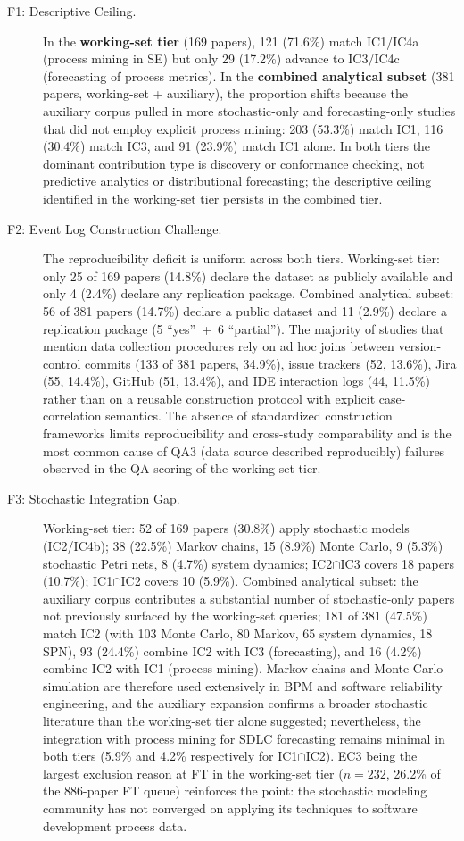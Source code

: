 \begin{description}

\item[F1: Descriptive Ceiling.]
In the \textbf{working-set tier} (169 papers), 121 (71.6\%) match IC1/IC4a
(process mining in SE) but only 29 (17.2\%) advance to IC3/IC4c (forecasting
of process metrics). In the \textbf{combined analytical subset} (381 papers, working-set
+ auxiliary), the proportion shifts because the auxiliary corpus pulled in
more stochastic-only and forecasting-only studies that did not employ
explicit process mining: 203 (53.3\%) match IC1, 116 (30.4\%) match IC3,
and 91 (23.9\%) match IC1 alone. In both tiers the dominant contribution
type is discovery or conformance checking, not predictive analytics or
distributional forecasting; the descriptive ceiling identified in the
working-set tier persists in the combined tier.

\item[F2: Event Log Construction Challenge.]
The reproducibility deficit is uniform across both tiers. Working-set tier:
only 25 of 169 papers (14.8\%) declare the dataset as publicly available
and only 4 (2.4\%) declare any replication package. Combined analytical
subset: 56 of
381 papers (14.7\%) declare a public dataset and 11 (2.9\%) declare a
replication package (5 ``yes''~+~6 ``partial''). The majority of studies
that mention data collection procedures rely on ad hoc joins between
version-control commits (133 of 381 papers, 34.9\%), issue trackers (52,
13.6\%), Jira (55, 14.4\%), GitHub (51, 13.4\%), and IDE interaction logs
(44, 11.5\%) rather than on a reusable construction protocol with explicit
case-correlation semantics. The absence of standardized construction
frameworks limits reproducibility and cross-study comparability and is the
most common cause of QA3 (data source described reproducibly) failures
observed in the QA scoring of the working-set tier.

\item[F3: Stochastic Integration Gap.]
Working-set tier: 52 of 169 papers (30.8\%) apply stochastic models
(IC2/IC4b); 38 (22.5\%) Markov chains, 15 (8.9\%) Monte Carlo, 9 (5.3\%)
stochastic Petri nets, 8 (4.7\%) system dynamics; IC2$\cap$IC3 covers 18
papers (10.7\%); IC1$\cap$IC2 covers 10 (5.9\%). Combined analytical
subset: the
auxiliary corpus contributes a substantial number of stochastic-only papers
not previously surfaced by the working-set queries; 181 of 381 (47.5\%)
match IC2 (with 103 Monte Carlo, 80 Markov, 65 system dynamics, 18 SPN), 93
(24.4\%) combine IC2 with IC3 (forecasting), and 16 (4.2\%) combine IC2
with IC1 (process mining). Markov chains and Monte Carlo simulation are
therefore used extensively in BPM and software reliability engineering, and
the auxiliary expansion confirms a broader stochastic literature than the
working-set tier alone suggested; nevertheless, the integration with process
mining for SDLC forecasting remains minimal in both tiers (5.9\% and 4.2\%
respectively for IC1$\cap$IC2). EC3 being the largest exclusion reason at
FT in the working-set tier ($n=232$, 26.2\% of the 886-paper FT queue)
reinforces the point: the stochastic modeling community has not converged
on applying its techniques to software development process data.


\end{description}
